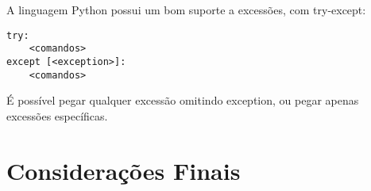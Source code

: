 \documentclass[12pt]{article}
\begin{document}
A linguagem Python possui um bom suporte a excessões, com \textsf{try-except}:

\begin{lstlisting}
try:
    <comandos>
except [<exception>]:
    <comandos>
\end{lstlisting}

É possível pegar qualquer excessão omitindo \textsf{exception}, ou pegar apenas
excessões específicas.

\section{Considerações Finais}


\printbibliography
\end{document}
